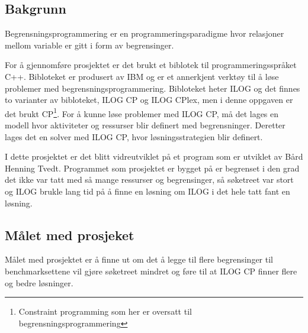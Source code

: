 \subsection{Bakgrunn}
Begrensningsprogrammering er en programmeringsparadigme hvor relasjoner mellom variable er gitt i form av begrensinger.

For å gjennomføre prosjektet er det brukt et biblotek til programmeringsspråket C++. Bibloteket er produsert av IBM og er et annerkjent verktøy til å løse problemer med begrensningsprogrammering. Bibloteket heter ILOG og det finnes to varianter av bibloteket, ILOG CP og ILOG CPlex, men i denne oppgaven er det brukt CP\footnote{Constraint programming som her er oversatt til begrensningsprogrammering}. For å kunne løse problemer med ILOG CP, må det lages en modell hvor aktiviteter og ressurser blir definert med begrensninger. Deretter lages det en solver med ILOG CP, hvor løsningsstrategien blir definert.

I dette prosjektet er det blitt vidreutviklet på et program som er utviklet av Bård Henning Tvedt. Programmet som prosjektet er bygget på er begrenset i den grad det ikke var tatt med så mange ressurser og begrensinger, så søketreet var stort og ILOG brukle lang tid på å finne en løsning om ILOG i det hele tatt fant en løsning.

\subsection{Målet med prosjeket}
Målet med prosjektet er å finne ut om det å legge til flere begrensinger til benchmarksettene vil gjøre søketreet mindret og føre til at ILOG CP finner flere og bedre løsninger.